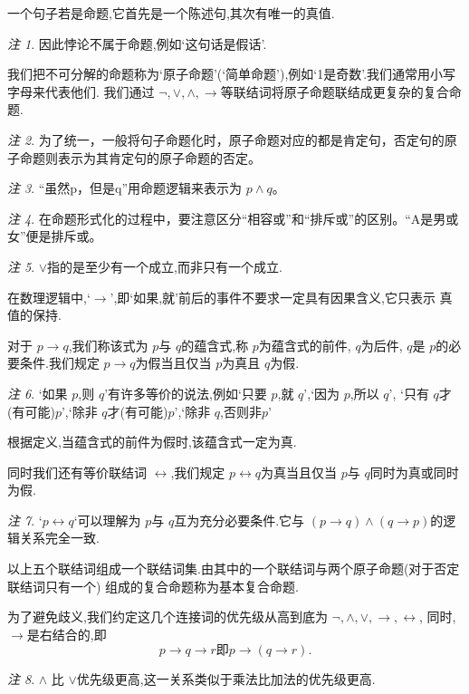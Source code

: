 \documentclass[a4paper,11pt]{article}%
\theoremstyle{remark}
\newtheorem*{remark}{注}
\theoremstyle{remark}
\theoremstyle{definition}
\theoremstyle{definition}
\theoremstyle{plain}
\begin{document}
一个句子若是命题,它首先是一个陈述句,其次有唯一的真值.
\begin{remark}
    因此悖论不属于命题,例如`这句话是假话'.
\end{remark}

我们把不可分解的命题称为`原子命题'(`简单命题'),例如`1是奇数'.我们通常用小写字母来代表他们.
我们通过 $\lnot,\lor,\land,\rightarrow$等联结词将原子命题联结成更复杂的复合命题.
\begin{remark}
    为了统一，一般将句子命题化时，原子命题对应的都是肯定句，否定句的原子命题则表示为其肯定句的原子命题的否定。
\end{remark}
\begin{remark}
    “虽然p，但是q”用命题逻辑来表示为 $p\land q$。
\end{remark}
\begin{remark}
    在命题形式化的过程中，要注意区分“相容或”和“排斥或”的区别。“A是男或女”便是排斥或。
\end{remark}
\begin{remark}
    $\lor$指的是至少有一个成立,而非只有一个成立.

    在数理逻辑中,`$\rightarrow$',即`如果,就'前后的事件不要求一定具有因果含义,它只表示
    真值的保持.
\end{remark}
对于 $p\rightarrow q$,我们称该式为 $p$与 $q$的蕴含式,称 $p$为蕴含式的前件,
$q$为后件, $q$是 $p$的必要条件.我们规定 $p\rightarrow q$为假当且仅当 $p$为真且
$q$为假.
\begin{remark}
   `如果 $p$,则 $q$'有许多等价的说法,例如`只要 $p$,就 $q$',`因为 $p$,所以 $q$',
   `只有 $q$才(有可能)$p$',`除非 $q$才(有可能)$p$',`除非 $q$,否则非$p$'

   根据定义,当蕴含式的前件为假时,该蕴含式一定为真.
\end{remark}

同时我们还有等价联结词 $\leftrightarrow $,我们规定 $p\leftrightarrow q$为真当且仅当
$p$与 $q$同时为真或同时为假.
\begin{remark}
    `$p\leftrightarrow q$`可以理解为 $p$与 $q$互为充分必要条件.它与
    $(p\rightarrow q)\land(q\rightarrow p)$的逻辑关系完全一致.
\end{remark}

以上五个联结词组成一个联结词集.由其中的一个联结词与两个原子命题(对于否定联结词只有一个)
组成的复合命题称为基本复合命题.

为了避免歧义,我们约定这几个连接词的优先级从高到底为 $\lnot,\land,\lor,\rightarrow,\leftrightarrow$,
同时, $\rightarrow$是右结合的,即 
\[p\rightarrow q\rightarrow r \text{即}p\rightarrow(q\rightarrow r).\]
\begin{remark}
    $\land$ 比 $\lor$优先级更高,这一关系类似于乘法比加法的优先级更高.
\end{remark}
\end{document}
